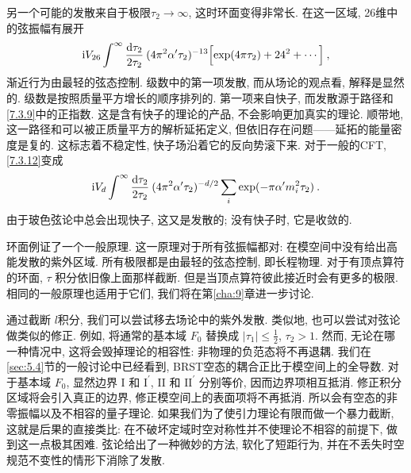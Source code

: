 另一个可能的发散来自于极限$\tau_{2} \rightarrow \infty$, 这时环面变得非常长. 在这一区域, 26维中的弦振幅有展开
\begin{equation}
	\mathrm{i} V_{26} \int^{\infty} \frac{\mathrm{d} \tau_{2}}{2 \tau_{2}} \:(4 \pi^{2} \alpha^{\prime} \tau_{2})^{-13}
	\Bigl[\exp (4 \pi \tau_{2})+24^{2}+\cdots\Bigr] \:, \label{7.3.15}
\end{equation}
渐近行为由最轻的弦态控制. 级数中的第一项发散, 而从场论的观点看, 解释是显然的. 级数是按照质量平方增长的顺序排列的. 第一项来自快子, 
而发散源于路径和\eqref{7.3.9}中的正指数. 这是含有快子的理论的产品, 不会影响更加真实的理论. 顺带地, 这一路径和可以被正质量平方的解析延拓定义, 
但依旧存在问题——延拓的能量密度是复的. 这标志着不稳定性, 快子场沿着它的反向势滚下来. 对于一般的CFT, \eqref{7.3.12}变成
\begin{equation}
	\mathrm{i} V_{d} \int^{\infty} \frac{\mathrm{d} \tau_{2}}{2 \tau_{2}} \: (4 \pi^{2} \alpha^{\prime} \tau_{2})^{-d / 2} 
	\sum_{i} \exp (-\pi \alpha^{\prime} m_{i}^{2} \tau_{2}) \:. \label{7.3.16}
\end{equation}
由于玻色弦论中总会出现快子, 这又是发散的; 没有快子时, 它是收敛的.

环面例证了一个一般原理. 这一原理对于所有弦振幅都对: 在模空间中没有给出高能发散的紫外区域. 所有极限都是由最轻的弦态控制, 即长程物理. 
对于有顶点算符的环面,  $\tau$ 积分依旧像上面那样截断. 但是当顶点算符彼此接近时会有更多的极限. 相同的一般原理也适用于它们, 我们将在第\ref{cha:9}章进一步讨论. 


通过截断 $l$积分, 我们可以尝试移去场论中的紫外发散. 类似地, 也可以尝试对弦论做类似的修正. 
例如, 将通常的基本域 $F_{0}$ 替换成 $|\tau_{1}| \leq \frac{1}{2}$, $\tau_{2}>1$. 
然而, 无论在哪一种情况中, 这将会毁掉理论的相容性: 非物理的负范态将不再退耦. 我们在\ref{sec:5.4}节的一般讨论中已经看到, BRST空态的耦合正比于模空间上的全导数. 
对于基本域 $F_{0}$, 显然边界 I 和 $\mathrm{I}^{\prime}$,  II 和 $\mathrm{II}^{\prime}$ 分别等价, 因而边界项相互抵消. 
修正积分区域将会引入真正的边界, 修正模空间上的表面项将不再抵消. 所以会有空态的非零振幅以及不相容的量子理论. 如果我们为了使引力理论有限而做一个暴力截断, 
这就是后果的直接类比: 在不破坏定域时空对称性并不使理论不相容的前提下, 做到这一点极其困难. 弦论给出了一种微妙的方法, 软化了短距行为, 
并在不丢失时空规范不变性的情形下消除了发散.

